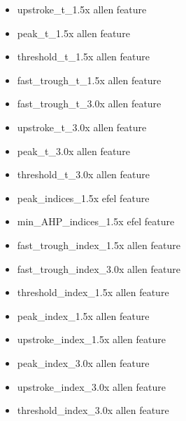 \begin{itemize}
    \item upstroke\_t\_1.5x allen feature
    \item  peak\_t\_1.5x allen feature
    \item threshold\_t\_1.5x allen feature
    \item fast\_trough\_t\_1.5x allen feature
    \item fast\_trough\_t\_3.0x allen feature
    \item upstroke\_t\_3.0x allen feature
    \item peak\_t\_3.0x allen feature
    \item threshold\_t\_3.0x allen feature
    \item peak\_indices\_1.5x efel feature
    \item min\_AHP\_indices\_1.5x efel feature
\end{itemize}


\begin{itemize}

    \item fast\_trough\_index\_1.5x allen feature
    \item fast\_trough\_index\_3.0x allen feature
    \item threshold\_index\_1.5x allen feature
    \item peak\_index\_1.5x allen feature
    \item upstroke\_index\_1.5x allen feature
    \item peak\_index\_3.0x allen feature
    \item upstroke\_index\_3.0x allen feature
    \item threshold\_index\_3.0x allen feature
\end{itemize}



